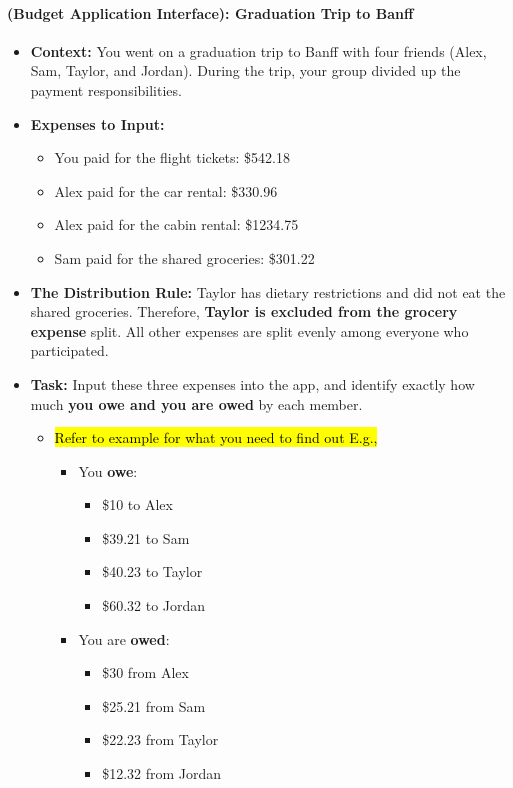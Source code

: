 \documentclass[12pt,a4paper]{article}
\begin{document}
\paragraph{(Budget Application Interface): Graduation Trip to Banff}
\begin{itemize}
    \item \textbf{Context:} You went on a graduation trip to Banff with four friends (Alex, Sam, Taylor, and Jordan). During the trip, your group divided up the payment responsibilities.
    
    \item \textbf{Expenses to Input:}
    \begin{itemize}
        \item You paid for the flight tickets: \$542.18
        \item Alex paid for the car rental: \$330.96
        \item Alex paid for the cabin rental: \$1234.75
        \item Sam paid for the shared groceries: \$301.22
    \end{itemize}
    
    \item \textbf{The Distribution Rule:} Taylor has dietary restrictions and did not eat the shared groceries. Therefore, \textbf{Taylor is excluded from the grocery expense} split. All other expenses are split evenly among everyone who participated.
    
    \item \textbf{Task:} Input these three expenses into the app, and identify exactly how much \textbf{you owe and you are owed} by each member.
    \begin{itemize}
        \item \hl{Refer to example for what you need to find out E.g.,}
        \begin{itemize}
            \item You \textbf{owe}:
            \begin{itemize}
                \item \$10 to Alex
                \item \$39.21 to Sam
                \item \$40.23 to Taylor
                \item \$60.32 to Jordan
            \end{itemize}
            \item You are \textbf{owed}:
            \begin{itemize}
                \item \$30 from Alex
                \item \$25.21 from Sam
                \item \$22.23 from Taylor
                \item \$12.32 from Jordan
            \end{itemize}
        \end{itemize}
    \end{itemize}
\end{itemize}
\end{document}
